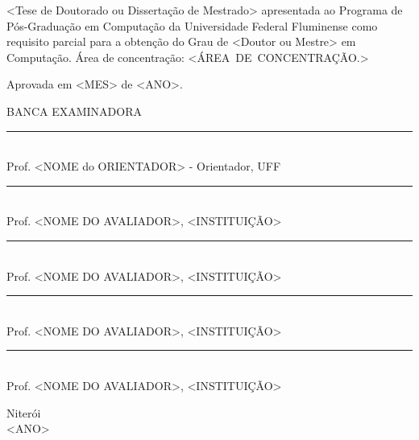 \noindent
\begin{flushright}
\begin{minipage}[t]{8cm}

<Tese de Doutorado ou Dissertação de Mestrado> apresentada ao Programa de P\'{o}s-Gradua\c{c}\~{a}o em Computa\c{c}\~{a}o da Universidade Federal Fluminense como requisito parcial para a obten\c{c}\~{a}o do \mbox{Grau} de <Doutor ou Mestre> em Computa\c{c}\~{a}o. \'{A}rea de concentra\c{c}\~{a}o: \mbox{<\'AREA DE CONCENTRA\c{C}\~AO.>} %

\end{minipage}
\end{flushright}
\vspace{1.0 cm}
\noindent
Aprovada em <MES> de <ANO>. \\
\begin{flushright}
  \parbox{11cm}
  {
  \begin{center}
  BANCA EXAMINADORA \\
  \vspace{6mm}
  \rule{11cm}{.1mm} \\
    Prof. <NOME do ORIENTADOR> - Orientador, UFF \\
    \vspace{6mm}
  \rule{11cm}{.1mm} \\
    Prof. <NOME DO AVALIADOR>, <INSTITUI\c{C}\~AO>\\
    \vspace{6mm}
  \rule{11cm}{.1mm} \\
    Prof. <NOME DO AVALIADOR>, <INSTITUI\c{C}\~AO>\\
  \vspace{4mm}
  \rule{11cm}{.1mm} \\
    Prof. <NOME DO AVALIADOR>, <INSTITUI\c{C}\~AO>\\
    \vspace{6mm}
  \rule{11cm}{.1mm} \\
    Prof. <NOME DO AVALIADOR>, <INSTITUIÇÃO>\\
  \vspace{6mm}
  \end{center}
  }
\end{flushright}
\begin{center}
  \vspace{4mm}
  Niter\'{o}i \\
  <ANO>

\end{center}

